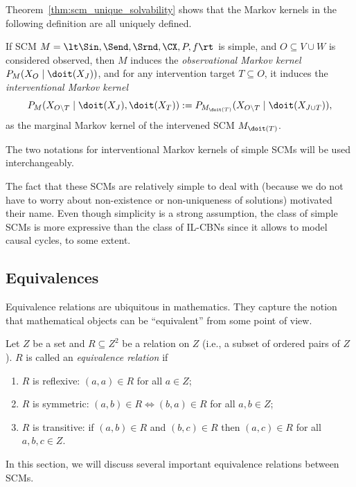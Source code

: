 Theorem~\ref{thm:scm_unique_solvability} shows that the Markov kernels in the following definition are all uniquely defined.
\begin{Def}\label{def:simple_scm_Markov_kernels}
  If SCM $M = \lt \Sin, \Send, \Srnd, \CX, P, f \rt$ is simple, and $O \subseteq V \cup W$ is considered observed,
  then $M$ induces the \emph{observational Markov kernel $P_{M}(X_O \mid \doit(X_J))$}, and for any intervention target 
  $T \subseteq O$, it induces the \emph{interventional Markov kernel}
  $$P_{M}(X_{O\setminus T} \mid \doit(X_J),\doit(X_T)) := P_{M_{\doit(T)}}(X_{O\setminus T} \mid \doit(X_{J \cup T})),$$
  as the marginal Markov kernel of the intervened SCM $M_{\doit(T)}$.
\end{Def}
The two notations for interventional Markov kernels of simple SCMs will be used interchangeably.

The fact that these SCMs are relatively simple to deal with (because we do not have to worry about non-existence or 
non-uniqueness of solutions) motivated their name.
Even though simplicity is a strong assumption, 
the class of simple SCMs is more expressive than the class of IL-CBNs since it allows to model causal cycles, to some extent.

\subsection{Equivalences}

Equivalence relations are ubiquitous in mathematics. They capture the notion that mathematical objects can be ``equivalent'' 
from some point of view.
\begin{Def}\label{def:equivalent_scms}
  Let $Z$ be a set and $R \subseteq Z^2$ be a relation on $Z$ (i.e., a subset of ordered pairs of $Z$). $R$ is called an \emph{equivalence relation} if 
  \begin{enumerate}
    \item $R$ is reflexive: $(a,a) \in R$ for all $a \in Z$;
    \item $R$ is symmetric: $(a,b) \in R \iff (b,a) \in R$ for all $a,b \in Z$;
    \item $R$ is transitive: if $(a,b) \in R$ and $(b,c) \in R$ then $(a,c) \in R$ for all $a,b,c\in Z$.
  \end{enumerate}
\end{Def}
In this section, we will discuss several important equivalence relations between SCMs.

